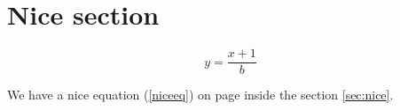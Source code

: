 \documentclass{article}
\begin{document}
\section{Nice section \label{sec:nice}}
\begin{equation}
     y=\frac{x+1}{b} \label{niceeq}
\end{equation}

We have a nice equation (\ref{niceeq}) on page \pageref{niceeq} inside the section \ref{sec:nice}.
\end{document}

